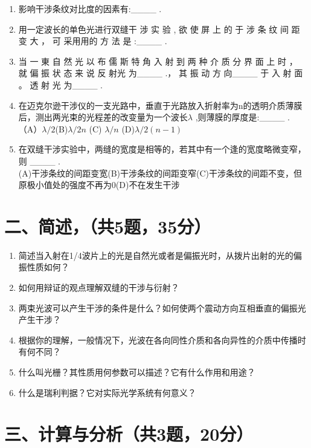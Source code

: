\documentclass[12pt, a4paper]{article}
\theoremstyle{solution}
\begin{document}
\begin{enumerate}
   \item  影响干涉条纹对⽐度的因素有:\_\_\_\_ .
   \item  ⽤⼀定波长的单⾊光进⾏双缝干 涉 实 验 , 欲 使 屏 上 的 于 涉 条 纹 间 距 变 ⼤ ， 可 采⽤用的 ⽅ 法 是 :\_\_\_\_ .
   \item  当 ⼀ 東 ⾃ 然 光 以 布 儒 斯 特 角 ⼊ 射 到 两 种 介 质 分 界 面 上 时 ， 就 偏 振 状 态 来 说 反 射光 为\_\_\_\_ .， 其 振 动 ⽅ 向\_\_\_\_  于 ⼊ 射 ⾯ 。 透 射 光 为\_\_\_\_ .
   \item 在迈克尔逊干涉仪的一支光路中，垂直于光路放入折射率为n的透明介质薄膜后，测出两光束的光程差的改变量为一个波长\(\lambda\) ,则薄膜的厚度是:\_\_\_\_ .\\（A）$\lambda/2$\qquad(B)$\lambda /2n$ \qquad(C) $\lambda /n$ \qquad(D)$\lambda /2(n-1)$
   \item 在双缝干涉实验中，两缝的宽度是相等的，若其中有一个逢的宽度略微变窄，则 \_\_\_\_ .\\(A)干涉条纹的间距变宽\qquad(B)干涉条纹的间距变窄\qquad(C)干涉条纹的间距不变，但原极小值处的强度不再为0\qquad(D)不在发生干涉
\end{enumerate}



\section*{二、简述，（共5题，35分）}
\begin{enumerate}
    \item 简述当入射在1/4波片上的光是自然光或者是偏振光时，从拨片出射的光的偏振性质如何？
    \item 如何用辩证的观点理解双缝的干涉与衍射？
    \item 两束光波可以产生干涉的条件是什么？如何使两个震动方向互相垂直的偏振光产生干涉？
    \item 根据你的理解，一般情况下，光波在各向同性介质和各向异性的介质中传播时有何不同？
    \item 什么叫光栅？其性质用何参数可以描述？它有什么作用和用途？
    \item 什么是瑞利判据？它对实际光学系统有何意义？
\end{enumerate}

\section*{三、计算与分析（共3题，20分）}
\end{document}
